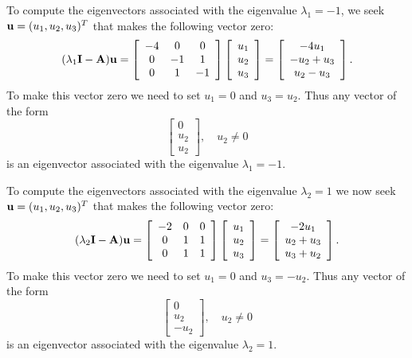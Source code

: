 \begin{solution}
\begin{enumerate}
To compute the eigenvectors associated with the eigenvalue $\lambda_1=-1$, we seek ${\bf u} = (u_1, u_2, u_3)^T$ that makes the following vector zero:
\[ (\lambda_1 {\bf I}-{\bf A}) {\bf u} = \left[\begin{array}{ccc}-4 & 0 & 0 \\ 0 & -1 & 1 \\ 0 & 1 & -1\end{array}\right]
                             \left[\begin{array}{c}u_1 \\ u_2\\ u_3\end{array}\right]
                           = \left[\begin{array}{c}-4u_1 \\ -u_2+u_3 \\ u_2-u_3\end{array}\right].\]
To make this vector zero we need to set $u_1 = 0$ and $u_3 = u_2$.
Thus any vector of the form
\[ \left[\begin{array}{c}0 \\ u_2 \\ u_2\end{array}\right], \quad u_2 \ne 0\]
is an eigenvector associated with the eigenvalue $\lambda_1=-1$.

To compute the eigenvectors associated with the eigenvalue $\lambda_2=1$ we now seek ${\bf u} = (u_1, u_2, u_3)^T$ that makes the following vector zero:
\[ (\lambda_2 {\bf I}-{\bf A}) {\bf u} = \left[\begin{array}{ccc}-2& 0 & 0 \\ 0 & 1 & 1 \\ 0 & 1 & 1\end{array}\right]
                             \left[\begin{array}{c}u_1 \\ u_2\\ u_3\end{array}\right]
                           = \left[\begin{array}{c}-2u_1 \\ u_2+u_3 \\ u_3+u_2\end{array}\right].\]
To make this vector zero we need to set $u_1 = 0$ and $u_3 = -u_2$.
Thus any vector of the form
\[ \left[\begin{array}{c}0 \\ u_2 \\ -u_2\end{array}\right], \quad u_2 \ne 0\]
is an eigenvector associated with the eigenvalue $\lambda_2=1$.


\end{enumerate}
\end{solution}
